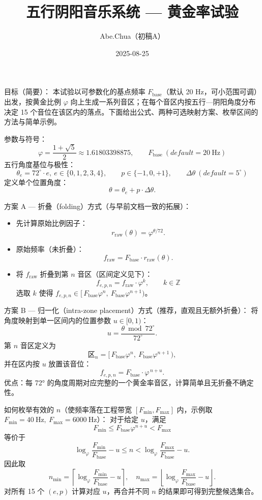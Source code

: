 \documentclass{article}
\title{五行阴阳音乐系统 — 黄金率试验}
\author{Abe.Chua（初稿A）}
\date{2025-08-25}
\begin{document}
\maketitle

目标（简要）：
本试验以可参数化的基点频率 \(F_{\mathrm{base}}\)（默认 20 Hz，可小范围可调）出发，按黄金比例 \(\varphi\) 向上生成一系列音区；在每个音区内按五行—阴阳角度分布决定 15 个音位在该区内的落点。下面给出公式、两种可选映射方案、枚举区间的方法与简单示例。

参数与符号：
\[
\varphi=\frac{1+\sqrt5}{2}\approx1.61803398875,\qquad F_{\mathrm{base}}\ (default=20\ \mathrm{Hz})
\]
五行角度基位与极性：
\[
\theta_e = 72^\circ\cdot e,\ e\in\{0,1,2,3,4\},\qquad p\in\{-1,0,+1\},\qquad \Delta\theta\ (default=5^\circ)
\]
定义单个位置角度：
\[
\theta=\theta_e + p\cdot\Delta\theta.
\]

方案 A — 折叠（folding）方式（与早前文档一致的拓展）：
\begin{itemize}
  \item 先计算原始比例因子：
  \[
  r_{\mathrm{raw}}(\theta)=\varphi^{\theta/72}.
  \]
  \item 原始频率（未折叠）：
  \[
  f_{\mathrm{raw}} = F_{\mathrm{base}}\cdot r_{\mathrm{raw}}(\theta).
  \]
  \item 将 \(f_{\mathrm{raw}}\) 折叠到第 \(n\) 音区（区间定义见下）：
  \[
  f_{e,p,n} = f_{\mathrm{raw}}\cdot\varphi^{k},\qquad k\in\mathbb{Z}
  \]
  选取 \(k\) 使得 \(f_{e,p,n}\in[\,F_{\mathrm{base}}\varphi^{n},\ F_{\mathrm{base}}\varphi^{n+1})\)。
\end{itemize}

方案 B — 归一化（intra-zone placement）方式（推荐，直观且无额外折叠）：
将角度映射到单一区间内的位置参数 \(u\in[0,1)\)：
\[
u=\frac{\theta \bmod 72^\circ}{72^\circ}.
\]
第 \(n\) 音区定义为
\[
\text{区}_n=[\,F_{\mathrm{base}}\varphi^{n},\ F_{\mathrm{base}}\varphi^{n+1}\,),
\]
并在区内按 \(u\) 放置该音位：
\[
f_{e,p,n} = F_{\mathrm{base}}\cdot \varphi^{\,n+u}.
\]
优点：每 72° 的角度周期对应完整的一个黄金率音区，计算简单且无折叠不确定性。

如何枚举有效的 \(n\)（使频率落在工程带宽 \([F_{\min},F_{\max}]\) 内，示例取 \(F_{\min}=40\ \mathrm{Hz},\ F_{\max}=6000\ \mathrm{Hz}\)）：
对于给定 \(u\)，满足
\[
F_{\min}\le F_{\mathrm{base}}\varphi^{n+u}<F_{\max}
\]
等价于
\[
\log_{\varphi}\frac{F_{\min}}{F_{\mathrm{base}}}-u \le n < \log_{\varphi}\frac{F_{\max}}{F_{\mathrm{base}}}-u.
\]
因此取
\[
n_{\min}=\left\lceil \log_{\varphi}\frac{F_{\min}}{F_{\mathrm{base}}}-u \right\rceil,\quad
n_{\max}=\left\lfloor \log_{\varphi}\frac{F_{\max}}{F_{\mathrm{base}}}-u \right\rfloor.
\]
对所有 15 个 \((e,p)\) 计算对应 \(u\)，再合并不同 \(n\) 的结果即可得到完整候选集合。
\end{document}

